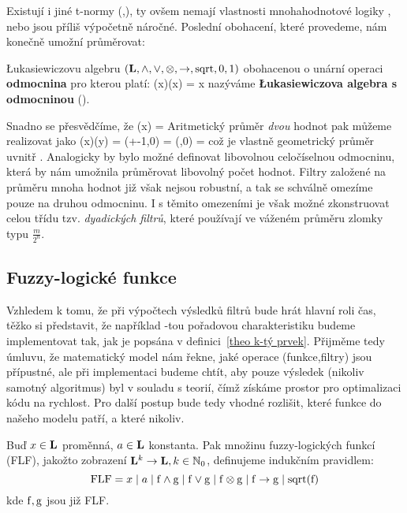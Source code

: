     Existují i jiné t-normy (\cite{MajerovaPhD},\cite{Bělíček}), ty ovšem nemají vlastnosti mnohahodnotové logiky \cite{MajerovaPhD}, nebo jsou příliš výpočetně náročné. Poslední obohacení, které provedeme, nám konečně umožní průměrovat:

    \begin{define}\label{LAsqrt}
    \L ukasiewiczovu algebru $(\mathbf{L},\wedge,\vee,\otimes,\rightarrow,\mathrm{sqrt},0,1)$ obohacenou o unární operaci \textbf{odmocnina} pro kterou platí:
    \beq
    \sqr(x)\otimes\sqr(x) = x
    \eeq
    nazýváme \textbf{\L ukasiewiczova algebra s odmocninou} \textup{(\LAsq)}.
    \end{define}

    Snadno se přesvědčíme, že
    \beq
    \sqr(x) = 
    \eeq
    Aritmetický průměr \emph{dvou} hodnot pak můžeme realizovat jako
    \beq
    \sqr(x)\otimes \sqr(y) = \max\left(+-1,0\right) = \max\left(,0\right) = 
    \eeq
    což je vlastně geometrický průměr uvnitř \LAsq. Analogicky by bylo možné definovat libovolnou celočíselnou odmocninu, která by nám umožnila průměrovat libovolný počet hodnot. Filtry založené na průměru mnoha hodnot již však nejsou robustní, a tak se schválně omezíme pouze na druhou odmocninu. I s těmito omezeními je však možné zkonstruovat celou třídu tzv. \emph{dyadických filtrů}, které používají ve váženém průměru zlomky typu $\frac{m}{2^n}$.

    \subsection{Fuzzy-logické funkce}

    Vzhledem k tomu, že při výpočtech výsledků filtrů bude hrát hlavní roli čas, těžko si představit, že například \kk-tou pořadovou charakteristiku budeme implementovat tak, jak je popsána v definici~\ref{theo k-tý prvek}. Přijměme tedy úmluvu, že matematický model nám řekne, jaké operace (funkce,filtry) jsou přípustné, ale při implementaci budeme chtít, aby pouze výsledek (nikoliv samotný algoritmus) byl v souladu s teorií, čímž získáme prostor pro optimalizaci kódu na rychlost. Pro další postup bude tedy vhodné rozlišit, které funkce do našeho modelu patří, a které nikoliv.

    \begin{define}\label{def FLF}
    Buď $x \in \mathbf{L}$ proměnná, $a \in \mathbf{L}$ konstanta. Pak množinu fuzzy-logických funkcí \textup{(FLF)}, jakožto zobrazení $\mathbf{L}^k \rightarrow \mathbf{L}, k \in \mathbb{N}_0$, definujeme indukčním pravidlem:
    \[
    \mathrm{FLF} = x \mid a \mid \mathrm{f} \wedge \mathrm{g} \mid \mathrm{f} \vee \mathrm{g} \mid \mathrm{f} \otimes \mathrm{g} \mid \mathrm{f} \rightarrow \mathrm{g} \mid \mathrm{sqrt}(\mathrm{f})
    \]
    kde $\mathrm{f},\mathrm{g}$ jsou již \textup{FLF}.
    \end{define}


